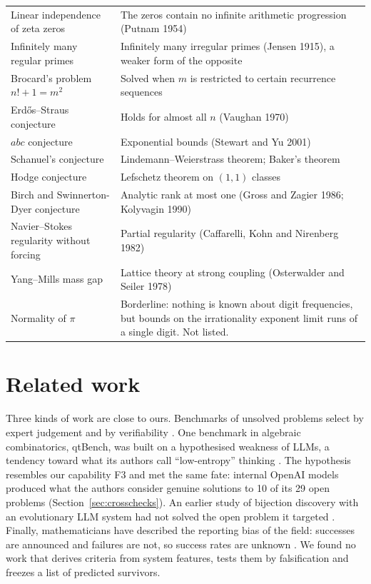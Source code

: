 \documentclass[11pt,a4paper]{article}
\theoremstyle{prob}
\begin{document}
{\begin{longtable}{L{4.2cm} L{11.0cm}}
Linear independence of zeta zeros & The zeros contain no infinite arithmetic progression (Putnam 1954)\\
Infinitely many regular primes & Infinitely many irregular primes (Jensen 1915), a weaker form of the opposite\\
Brocard's problem $n!+1=m^2$ & Solved when $m$ is restricted to certain recurrence sequences \cite{bravo}\\
Erd\H{o}s--Straus conjecture & Holds for almost all $n$ (Vaughan 1970)\\
$abc$ conjecture & Exponential bounds (Stewart and Yu 2001)\\
Schanuel's conjecture & Lindemann--Weierstrass theorem; Baker's theorem\\
Hodge conjecture & Lefschetz theorem on $(1,1)$ classes\\
Birch and Swinnerton-Dyer conjecture & Analytic rank at most one (Gross and Zagier 1986; Kolyvagin 1990)\\
Navier--Stokes regularity without forcing & Partial regularity (Caffarelli, Kohn and Nirenberg 1982)\\
Yang--Mills mass gap & Lattice theory at strong coupling (Osterwalder and Seiler 1978)\\
Normality of $\pi$ & Borderline: nothing is known about digit frequencies, but bounds on the irrationality exponent limit runs of a single digit. Not listed.\\
\end{longtable}}

\FloatBarrier
\section{Related work}

Three kinds of work are close to ours. Benchmarks of unsolved problems select by expert judgement and by verifiability \cite{fmop,horizon,fme,fc}. One benchmark in algebraic combinatorics, qtBench, was built on a hypothesised weakness of LLMs, a tendency toward what its authors call ``low-entropy'' thinking \cite{combi}. The hypothesis resembles our capability F3 and met the same fate: internal OpenAI models produced what the authors consider genuine solutions to 10 of its 29 open problems (Section~\ref{sec:crosschecks}). An earlier study of bijection discovery with an evolutionary LLM system had not solved the open problem it targeted \cite{brown}. Finally, mathematicians have described the reporting bias of the field: successes are announced and failures are not, so success rates are unknown \cite{taoicm,fme}. We found no work that derives criteria from system features, tests them by falsification and freezes a list of predicted survivors.
\end{document}
